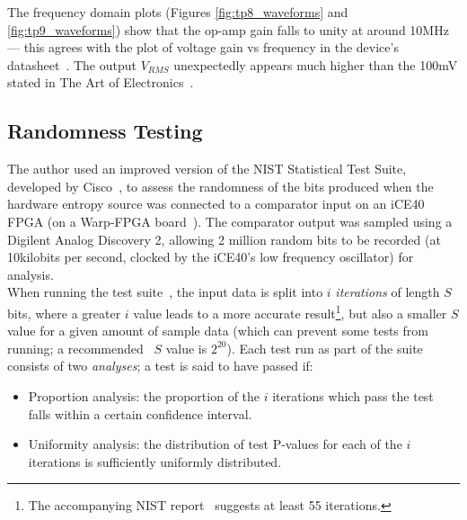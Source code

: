 \documentclass[12pt]{article}
\begin{document}
      The frequency domain plots (Figures \ref{fig:tp8_waveforms} and \ref{fig:tp9_waveforms}) show that the op-amp gain falls to unity at around 10MHz --- this agrees with the plot of voltage gain vs frequency in the device's datasheet~\cite{lt1215}. The output $V_{RMS}$ unexpectedly appears much higher than the 100mV stated in The Art of Electronics~\cite[p.~984]{art_of_electronics}.


  \subsection{Randomness Testing} \label{subsection:eval_randomness}
    The author used an improved version of the NIST Statistical Test Suite, developed by Cisco~\cite{arcetri_sts}, to assess the randomness of the bits produced when the hardware entropy source was connected to a comparator input on an iCE40 FPGA (on a Warp-FPGA board~\cite{stanley2018hardware}). The comparator output was sampled using a Digilent Analog Discovery 2, allowing 2 million random bits to be recorded (at 10kilobits per second, clocked by the iCE40's low frequency oscillator) for analysis.\\

    When running the test suite~\cite{nist_test_suite}, the input data is split into $i$ \textit{iterations} of length $S$ bits, where a greater $i$ value leads to a more accurate result\footnote{The accompanying NIST report~\cite{nist_test_suite} suggests at least 55 iterations.}, but also a smaller $S$ value for a given amount of sample data (which can prevent some tests from running; a recommended~\cite{arcetri_sts} $S$ value is $2^{20}$). Each test run as part of the suite consists of two \textit{analyses}; a test is said to have passed if:
    \begin{itemize}
      \item Proportion analysis: the proportion of the $i$ iterations which pass the test falls within a certain confidence interval.
      \item Uniformity analysis: the distribution of test P-values for each of the $i$ iterations is sufficiently uniformly distributed.
    \end{itemize}
\end{document}
